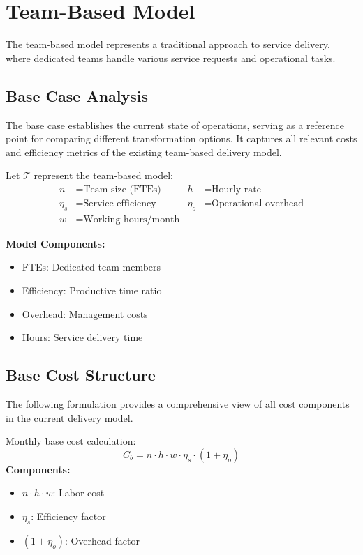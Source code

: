 \documentclass[12pt,a4paper]{article}
\newenvironment{definition}[1]
{\begin{mdframed}[style=definitionstyle,frametitle={Definition: #1}]}
{\end{mdframed}}
\newenvironment{explanation}
{\begin{mdframed}[style=explanationstyle,frametitle={Explanation}]}
{\end{mdframed}}
\begin{document}
\section{Team-Based Model}
The team-based model represents a traditional approach to service delivery, where dedicated teams handle various service requests and operational tasks.

\subsection{Base Case Analysis}
The base case establishes the current state of operations, serving as a reference point for comparing different transformation options. It captures all relevant costs and efficiency metrics of the existing team-based delivery model.

\begin{definition}{Team Model Variables}
Let $\mathcal{T}$ represent the team-based model:
\begin{align*}
    n &= \text{Team size (FTEs)} & h &= \text{Hourly rate} \\
    \eta_s &= \text{Service efficiency} & \eta_o &= \text{Operational overhead} \\
    w &= \text{Working hours/month} & &
\end{align*}
\end{definition}

\begin{explanation}
\textbf{Model Components:}
\begin{itemize}
    \item FTEs: Dedicated team members
    \item Efficiency: Productive time ratio
    \item Overhead: Management costs
    \item Hours: Service delivery time
\end{itemize}
\end{explanation}

\subsection{Base Cost Structure}
The following formulation provides a comprehensive view of all cost components in the current delivery model.

\begin{definition}{Base Team Cost}
Monthly base cost calculation:
\begin{equation}
    C_b = n \cdot h \cdot w \cdot \eta_s \cdot (1 + \eta_o)
\end{equation}
\textbf{Components:}
\begin{itemize}
    \item $n \cdot h \cdot w$: Labor cost
    \item $\eta_s$: Efficiency factor
    \item $(1 + \eta_o)$: Overhead factor
\end{itemize}
\end{definition}
\end{document}
